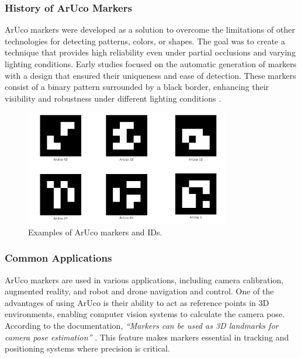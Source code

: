     \subsubsection{History of ArUco Markers}

    ArUco markers were developed as a solution to overcome the limitations of other technologies for detecting patterns, colors, or shapes. The goal was to create a technique that provides high reliability even under partial occlusions and varying lighting conditions. Early studies focused on the automatic generation of markers with a design that ensured their uniqueness and ease of detection. These markers consist of a binary pattern surrounded by a black border, enhancing their visibility and robustness under different lighting conditions \cite{aruco_docs}.

    \begin{figure}[H] 
        \centering 
        \includegraphics[width=0.8\textwidth]{pictures/arucos_ids.png} %
        \caption{Examples of ArUco markers and IDs.} 
        \label{fig} 
    \end{figure}

    \subsubsection{Common Applications}

    ArUco markers are used in various applications, including camera calibration, augmented reality, and robot and drone navigation and control. One of the advantages of using ArUco is their ability to act as reference points in 3D environments, enabling computer vision systems to calculate the camera pose. According to the documentation, \textit{“Markers can be used as 3D landmarks for camera pose estimation”} \cite{aruco_docs_pdf}. This feature makes markers essential in tracking and positioning systems where precision is critical.

